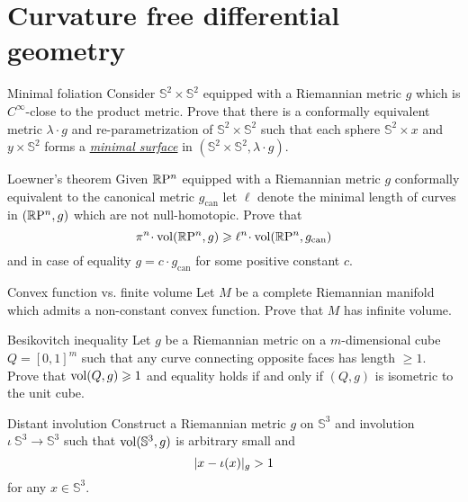 \documentclass[twoside]{book}
\begin{document}
\chapter{Curvature free differential geometry}


\begin{pr}{\thm}{Minimal foliation}\label{gromomorphic-curves} Consider $\mathbb{S}^2\times \mathbb{S}^2$ equipped with a Riemannian metric $g$ which
is $C^\infty$-close to the product metric. Prove that there is a conformally equivalent metric $\lambda\cdot g$ and re-parametrization of $\mathbb{S}^2\times \mathbb{S}^2$
such that each sphere $\mathbb{S}^2\times x$ and $y\times \mathbb{S}^2$ forms a \hyperref[Minimal surface]{\emph{minimal surface}} 
in $(\mathbb{S}^2\times \mathbb{S}^2,\lambda\cdot g)$.
\end{pr}

\begin{pr}{}{Loewner's theorem}\label{Loewner's theorem}
 Given $\mathbb{R}\mathrm{P}^n$ equipped with a Riemannian metric $g$
conformally equivalent to the canonical metric $g_{\text{can}}$ let $\ell$ denote the minimal length of curves in $(\mathbb{R}\mathrm{P}^n,g)$ which are not null-homotopic. Prove that 
$$\pi^n\cdot\vol(\RP^n,g)
\ge 
\ell^n
\cdot
\vol(\RP^n,g_{\text{can}})$$ 
and in case of equality $g=c\cdot g_{\text{can}}$ for some positive constant $c$.
\end{pr}

\begin{pr}{\thm}{Convex function vs. finite volume}\label{convex-infinite} Let
$M$ be a complete Riemannian manifold which admits a non-constant
convex function. Prove that $M$ has infinite volume.
\end{pr}

\begin{pr}{}{Besikovitch inequality}\label{Besikovitch inequality}
Let $g$ be a Riemannian metric on a $m$-dimensional cube $Q=[0,1]^m$ such that any curve connecting opposite faces has length $\ge 1$. Prove that $\operatorname{\rm vol}(Q,g)\geqslant 1$ and equality holds if and only if $(Q,g)$ is isometric to the unit cube.
\end{pr}

\begin{pr}{}{Distant involution}\label{Distant involution}
Construct a Riemannian metric $g$ on $\mathbb{S}^3$ and involution $\iota\:\mathbb{S}^3\to\mathbb{S}^3$ such that $\operatorname{\rm vol} (\mathbb{S}^3,g)$ is arbitrary small and 
\[|x\z-\iota(x)|_g>1\]
 for any $x\in\mathbb{S}^3$.
\end{pr}
\end{document}
